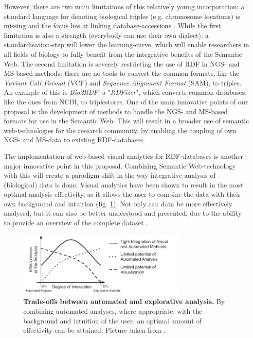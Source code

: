 \documentclass[twoside,fontsize=10pt]{article}
\begin{document}
However, there are two main limitations of this relatively young incorporation: a standard language for denoting biological triples (e.g. chromosome locations) is missing and the focus lies at linking database-accessions \citep{Ruttenberg2007}. While the first limitation is also a strength (everybody can use their own dialect), a standardisation-step will lower the learning-curve, which will enable researchers in all fields of biology to fully benefit from the integrative benefits of the Semantic Web. The second limitation is  severely restricting the use of RDF in NGS- and MS-based methods: there are no tools to convert the common formats, like the \textit{Variant Call Format} (VCF) and \textit{Sequence Alignment Format} (SAM), to triples. An example of this is  \textit{Bio2RDF}\cite{Belleau2008}: a "\textit{RDFizer}", which converts common databases, like the ones from NCBI, to triplestores. One of the main innovative points of our proposal is the development of methods to handle the NGS- and MS-based formats for use in the Semantic Web. This will result in a broader use of semantic web-technologies for the research community, by enabling the coupling of own NGS- and MS-data to existing RDF-databases.
\medskip

\noindent
The implementation of web-based visual analytics for RDF-databases is another major innovative point in this proposal. Combining Semantic Web-technology with this will create a paradigm shift in the way integrative analysis of (biological) data is done. Visual analytics have been shown to result in the most optimal analysis-effectivity, as it allows the user to combine the data with their own background and intuition (fig. \ref{fig:ae}). Not only can data be more effectively analysed, but it can also be better understood and presented, due to the ability to provide an overview of the complete dataset \cite{Thomas2005, Keim}. 

\begin{figure}[H]
    \centering
    \includegraphics[width=0.75\textwidth]{autoVSexplo}
    \caption{\textbf{Trade-offs between automated and explorative analysis.} By combining automated analyses, where appropriate, with the background and intuition of the user, an optimal amount of effectivity can be attained. Picture taken from \citet{Keim}.}
    \label{fig:ae}
\end{figure}
\medskip
\end{document}
